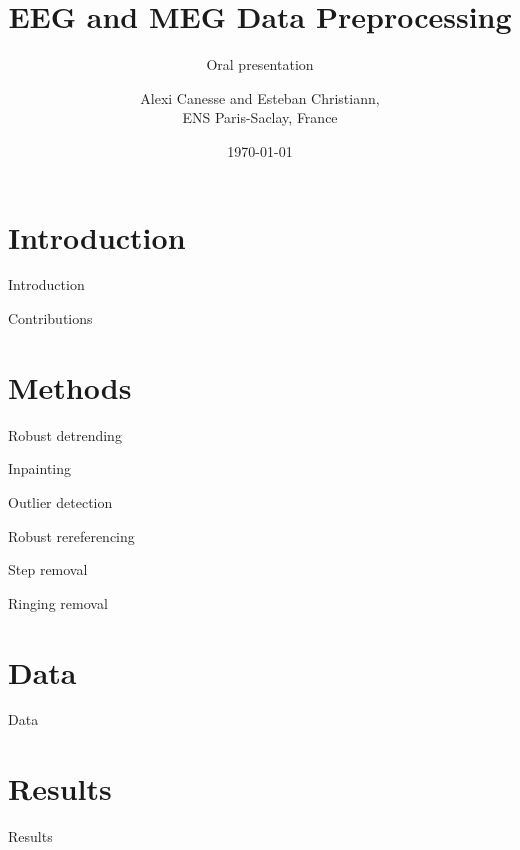 \documentclass[10pt,serif]{beamer}
\title[] %
{EEG and MEG Data Preprocessing}
\subtitle{Oral presentation}
\author[Esteban Christiann, Alexi Canesse]{{Alexi \sc Canesse} and {Esteban \sc Christiann},\\ ENS Paris-Saclay, France}
\institute[] %
{
    Project for the time series course\\
    Part of the MVA program at ENS Paris-Saclay.\\
}
\date[Oral presentation] %
{\today}
\begin{document}
% 


\begin{frame}
  \titlepage
\end{frame}

\section[\color{white} Introduction]{Introduction}\label{sec:introduction}

\begin{frame}{Introduction}

\end{frame}

\begin{frame}{Contributions}

\end{frame}

\section[\color{white} Methods]{Methods}\label{sec:methods}

\begin{frame}{Robust detrending}

\end{frame}

\begin{frame}{Inpainting}

\end{frame}

\begin{frame}{Outlier detection}

\end{frame}

\begin{frame}{Robust rereferencing}

\end{frame}

\begin{frame}{Step removal}

\end{frame}

\begin{frame}{Ringing removal}

\end{frame}

\section[\color{white} Data]{Data}\label{sec:data}

\begin{frame}{Data}

\end{frame}

\section[\color{white} Data]{Results}\label{sec:results}

\begin{frame}{Results}

\end{frame}
\end{document}
